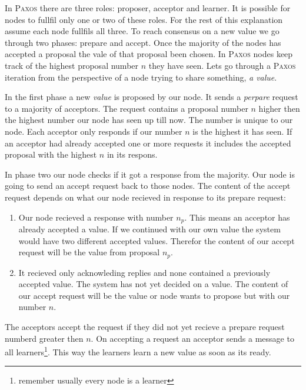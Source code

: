 In \textsc{Paxos} there are three roles: proposer, acceptor and learner. It is possible for nodes to fullfil only one or two of these roles. For the rest of this explanation assume each node fullfils all three. To reach consensus on a new value we go through two phases: prepare and accept. Once the majority of the nodes has accepted a proposal the vale of that proposal been chosen. In \textsc{Paxos} nodes keep track of the highest proposal number $n$ they have seen. Lets go through a \textsc{Paxos} iteration from the perspective of a node trying to share something, \textit{a value}.

In the first phase a new \textit{value} is proposed by our node. It sends a \textit{perpare} request to a majority of acceptors. The request contains a proposal number $n$ higher then the highest number our node has seen up till now. The number is unique to our node. Each acceptor only responds if our number $n$ is the highest it has seen. If an acceptor had already accepted one or more requests it includes the accepted proposal with the highest $n$ in its respons.

In phase two our node checks if it got a response from the majority. Our node is going to send an accept request back to those nodes. The content of the accept request depends on what our node recieved in response to its prepare request:
%
\begin{enumerate}
	\item Our node recieved a response with number $n_p$. This means an acceptor has already accepted a value. If we continued with our own value the system would have two different accepted values. Therefor the content of our accept request will be the value from proposal $n_p$.
	\item It recieved only acknowleding replies and none contained a previously accepted value. The system has not yet decided on a value. The content of our accept request will be the value or node wants to propose but with our number $n$.
\end{enumerate}
%
The acceptors accept the request if they did not yet recieve a prepare request numberd greater then $n$. On accepting a request an acceptor sends a message to all learners\footnote{remember usually every node is a learner}. This way the learners learn a new value as soon as its ready.


